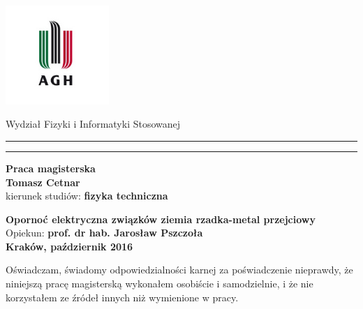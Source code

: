 \documentclass[a4paper,12pt]{article}
\numberwithin{equation}{section}
\begin{document}

\thispagestyle{empty}
\includegraphics[height=37.5mm]{logo.jpg}
\begin{center}
  \large
  \textsf{Wydział Fizyki i Informatyki Stosowanej}
\end{center}
\rule{\textwidth}{3pt}
\rule[2ex]{\textwidth}{1pt}
\begin{center}
{\LARGE \bf \textsf{Praca magisterska}}\\
\vspace{8ex}
{\bf \Large \textsf{Tomasz Cetnar}}\\
\vspace{6ex}
{\sf\small kierunek studiów:} {\bf\small \textsf{fizyka techniczna}}\\
\vspace{7ex}

{\bf \huge \textsf{Opornoć elektryczna związków ziemia rzadka-metal przejciowy}}\\
\vspace{10ex}
{\Large \textsf{Opiekun:} \bf \textsf{prof. dr hab. Jarosław Pszczoła}}\\
\vspace{6ex}
{\large \bf \textsf{Kraków, październik 2016}}
\end{center}

\newpage





Oświadczam, świadomy odpowiedzialności karnej za poświadczenie nieprawdy, że niniejszą pracę magisterską wykonałem
osobiście i samodzielnie, i że nie korzystałem ze źródeł innych niż wymienione w pracy.
\end{document}
